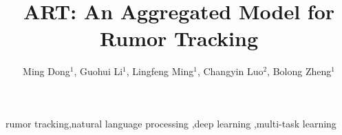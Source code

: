 \documentclass[review]{elsarticle}
\begin{document}
\begin{frontmatter}

\title{ART: An Aggregated Model for Rumor Tracking}

\author{Ming Dong$^1$, Guohui Li$^1$, Lingfeng Ming$^1$, Changyin Luo$^2$, Bolong Zheng$^1$}
\address{$^1$Huazhong University of Science and Technology, Wuhan, China}
\address{$^2$Central China Normal University, Wuhan, China}




\begin{keyword}
rumor tracking\sep natural language processing \sep deep learning \sep multi-task learning
\end{keyword}

\end{frontmatter}

\linenumbers









\end{document}
